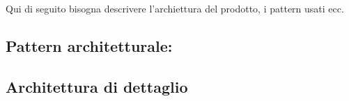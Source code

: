 \documentclass[../manuale_sviluppatore.tex]{subfiles}
\begin{document}
Qui di seguito bisogna descrivere l'archiettura del prodotto, i pattern usati ecc.

\subsection{Pattern architetturale: }

\subsection{Architettura di dettaglio}
\end{document}
